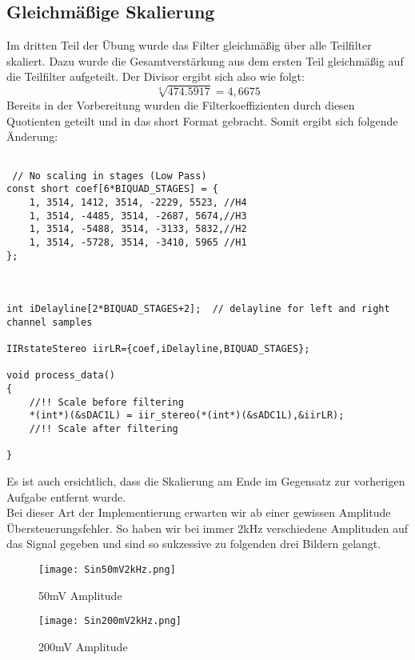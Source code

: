 \subsection{Gleichmäßige Skalierung}
Im dritten Teil der Übung wurde das Filter gleichmäßig über alle Teilfilter skaliert. Dazu wurde die Gesamtverstärkung aus dem ersten Teil gleichmäßig auf die Teilfilter aufgeteilt. Der Divisor ergibt sich also wie folgt:\\
\begin{equation}
\sqrt[4]{474.5917}=4,6675
\end{equation}
Bereits in der Vorbereitung wurden die Filterkoeffizienten durch diesen Quotienten geteilt und in das short Format gebracht. Somit ergibt sich folgende Änderung:\\
\begin{adjustbox}{width=\textwidth,height=\textheight,keepaspectratio}
 \begin{lstlisting}[title=processdata.c]
 
 // No scaling in stages (Low Pass)
const short coef[6*BIQUAD_STAGES] = {
	1, 3514, 1412, 3514, -2229, 5523, //H4
	1, 3514, -4485, 3514, -2687, 5674,//H3
	1, 3514, -5488, 3514, -3133, 5832,//H2
	1, 3514, -5728, 3514, -3410, 5965 //H1
};



int iDelayline[2*BIQUAD_STAGES+2];	// delayline for left and right channel samples

IIRstateStereo iirLR={coef,iDelayline,BIQUAD_STAGES};

void process_data()
{
	//!! Scale before filtering
	*(int*)(&sDAC1L) = iir_stereo(*(int*)(&sADC1L),&iirLR);
	//!! Scale after filtering

}

\end{lstlisting}
\end{adjustbox}
Es ist auch ersichtlich, dass die Skalierung am Ende im Gegensatz zur vorherigen Aufgabe entfernt wurde.\\
Bei dieser Art der Implementierung erwarten wir ab einer gewissen Amplitude Übersteuerungsfehler. So haben wir bei immer 2kHz verschiedene Amplituden auf das Signal gegeben und sind so sukzessive zu folgenden drei Bildern gelangt.
\begin{figure}[H]
  \centering
    \texttt{[image: Sin50mV2kHz.png]}
  \caption{50mV Amplitude}
  \label{fig:Sin50mV2kHz}
\end{figure}
\begin{figure}[H]
  \centering
    \texttt{[image: Sin200mV2kHz.png]}
  \caption{200mV Amplitude}
  \label{fig:Sin200mV2kHz}
\end{figure}
